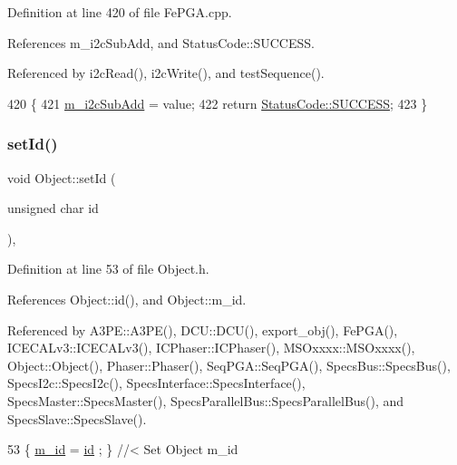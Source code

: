 Definition at line 420 of file Fe\+P\+G\+A.\+cpp.



References m\+\_\+i2c\+Sub\+Add, and Status\+Code\+::\+S\+U\+C\+C\+E\+SS.



Referenced by i2c\+Read(), i2c\+Write(), and test\+Sequence().


\begin{DoxyCode}
420                                                        \{
421   \hyperlink{classFePGA_aba8c2c8d8e0d136826b9dd4c2d7c2e90}{m\_i2cSubAdd} = value;
422   \textcolor{keywordflow}{return} \hyperlink{classStatusCode_a6f565cbeadc76d14c72f047e5e85eb4badd0da38d3ba0d922efd1f4619bc37ad8}{StatusCode::SUCCESS};
423 \}
\end{DoxyCode}
\mbox{\label{classObject_a398fe08cba594a0ce6891d59fe4f159f}} 
\subsubsection{\texorpdfstring{set\+Id()}{setId()}}
{\footnotesize\ttfamily void Object\+::set\+Id (\begin{DoxyParamCaption}\item[{unsigned char}]{id }\end{DoxyParamCaption})\hspace{0.3cm}{\ttfamily [inline]}, {\ttfamily [inherited]}}



Definition at line 53 of file Object.\+h.



References Object\+::id(), and Object\+::m\+\_\+id.



Referenced by A3\+P\+E\+::\+A3\+P\+E(), D\+C\+U\+::\+D\+C\+U(), export\+\_\+obj(), Fe\+P\+G\+A(), I\+C\+E\+C\+A\+Lv3\+::\+I\+C\+E\+C\+A\+Lv3(), I\+C\+Phaser\+::\+I\+C\+Phaser(), M\+S\+Oxxxx\+::\+M\+S\+Oxxxx(), Object\+::\+Object(), Phaser\+::\+Phaser(), Seq\+P\+G\+A\+::\+Seq\+P\+G\+A(), Specs\+Bus\+::\+Specs\+Bus(), Specs\+I2c\+::\+Specs\+I2c(), Specs\+Interface\+::\+Specs\+Interface(), Specs\+Master\+::\+Specs\+Master(), Specs\+Parallel\+Bus\+::\+Specs\+Parallel\+Bus(), and Specs\+Slave\+::\+Specs\+Slave().


\begin{DoxyCode}
53 \{ \hyperlink{classObject_aca74b9dbfed7b5556ea2d56c65b6b6b0}{m\_id}    = \hyperlink{classObject_af99145335cc61ff6e2798ea17db009d2}{id}    ; \} \textcolor{comment}{//< Set Object m\_id}
\end{DoxyCode}
\mbox{\label{classObject_ae30fea75683c2d149b6b6d17c09ecd0c}} 
